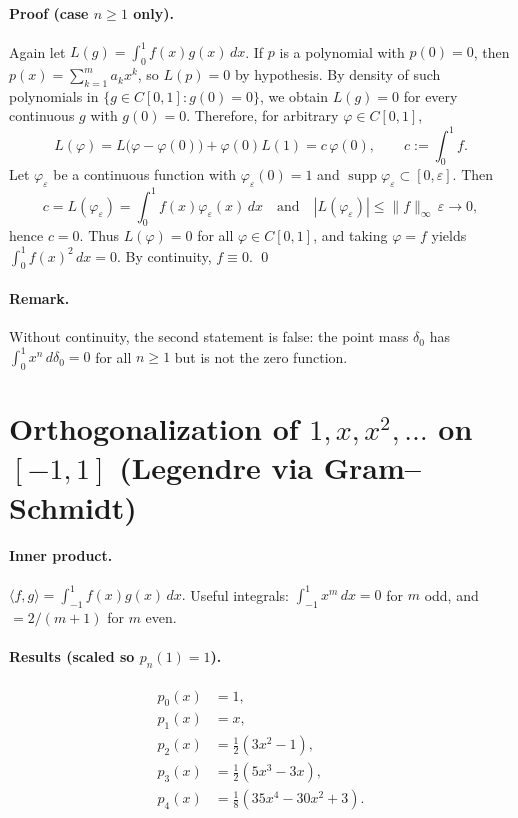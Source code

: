 \documentclass[11pt,a4paper]{article}
\theoremstyle{definition}
\theoremstyle{definition}
\theoremstyle{plain}
\theoremstyle{remark}
\begin{document}
\paragraph{Proof (case \(n\ge1\) only).}
Again let \(L(g)=\int_0^1 f(x)g(x)\,dx\).
If \(p\) is a polynomial with \(p(0)=0\), then \(p(x)=\sum_{k=1}^m a_k x^k\), so \(L(p)=0\) by hypothesis.
By density of such polynomials in \(\{g\in C[0,1]:g(0)=0\}\), we obtain
\(L(g)=0\) for every continuous \(g\) with \(g(0)=0\).
Therefore, for arbitrary \(\varphi\in C[0,1]\),
\[
L(\varphi)=L\big(\varphi-\varphi(0)\big)+\varphi(0)L(1)=c\,\varphi(0),\qquad c:=\int_0^1 f.
\]
Let \(\varphi_\varepsilon\) be a continuous function with \(\varphi_\varepsilon(0)=1\) and
\(\operatorname{supp}\varphi_\varepsilon\subset[0,\varepsilon]\).
Then
\[
c=L(\varphi_\varepsilon)=\int_0^1 f(x)\varphi_\varepsilon(x)\,dx
\quad\text{and}\quad |L(\varphi_\varepsilon)|\le \|f\|_\infty\,\varepsilon\to0,
\]
hence \(c=0\). Thus \(L(\varphi)=0\) for all \(\varphi\in C[0,1]\), and taking \(\varphi=f\) yields
\(\int_0^1 f(x)^2\,dx=0\). By continuity, \(f\equiv0\).
\qed

\paragraph{Remark.}
Without continuity, the second statement is false: the point mass \(\delta_0\) has
\(\int_0^1 x^n\,d\delta_0=0\) for all \(n\ge1\) but is not the zero function.

\section*{Orthogonalization of \(1,x,x^2,\dots\) on \([-1,1]\) (Legendre via Gram--Schmidt)}

\paragraph{Inner product.}
\(\displaystyle \langle f,g\rangle=\int_{-1}^{1} f(x)g(x)\,dx.\)
Useful integrals: \(\int_{-1}^{1} x^m\,dx=0\) for \(m\) odd, and \(=2/(m+1)\) for \(m\) even.

\paragraph{Results (scaled so \(p_n(1)=1\)).}
\[
\begin{aligned}
	p_0(x)&=1,\\
	p_1(x)&=x,\\
	p_2(x)&=\tfrac12(3x^2-1),\\
	p_3(x)&=\tfrac12(5x^3-3x),\\
	p_4(x)&=\tfrac18(35x^4-30x^2+3).
\end{aligned}
\]
\end{document}
